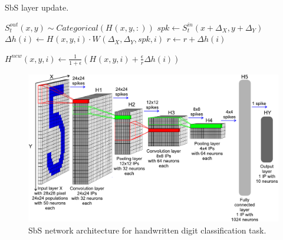 \begin{algorithm}[t!]
	\label{alg:sbs}
	\caption{SbS layer update.}
	
	\begin{algorithmic}[1]
		\STATE $S^{out}_t(x, y) \sim Categorical( H^{}(x, y, :) ) $
		\STATE $spk \leftarrow S^{in}_t(x + \Delta_X , y + \Delta_Y)$
		\STATE $\Delta h(i)
		\leftarrow H^{}(x, y,  i) \cdot W^{}(\Delta_X, \Delta_Y, spk, i)$
		\STATE $r \leftarrow r + \Delta h(i)$
		\ENDFOR
		
		\STATE $H^{new}(x, y, i) \leftarrow \frac{1}{1+\epsilon} \left( H^{}(x, y, i) + \frac{\epsilon}{r} \Delta h(i) \right) $              
		\ENDFOR
		\ENDFOR
		\ENDFOR
		\ENDFOR
	\end{algorithmic} 
\end{algorithm}

\begin{figure}[t!]
	\includegraphics[width=\columnwidth]{../figures/sbs_network.pdf}
	\caption{SbS network architecture for handwritten digit classification task.}
	\label{fig:sbs_network}
\end{figure}


